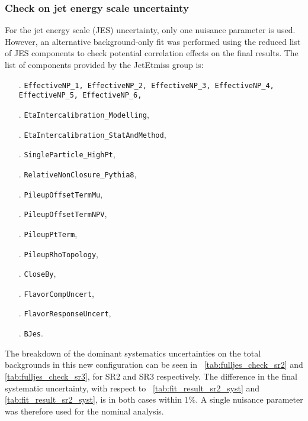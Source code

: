 
\subsubsection{Check on jet energy scale uncertainty} \label{sec:JEScheck}

For the jet energy scale (JES) uncertainty, only one nuisance parameter is used. However, an alternative background-only fit was performed using the reduced list of JES components to check potential correlation effects on the final results.
The list of components provided by the JetEtmiss group is:

{\footnotesize
\begin{itemize}
\item[.] \texttt{EffectiveNP\_1, EffectiveNP\_2, EffectiveNP\_3, EffectiveNP\_4, EffectiveNP\_5, EffectiveNP\_6,}
\item[.] \texttt{EtaIntercalibration\_Modelling},
\item[.] \texttt{EtaIntercalibration\_StatAndMethod},
\item[.] \texttt{SingleParticle\_HighPt},
\item[.] \texttt{RelativeNonClosure\_Pythia8},
\item[.] \texttt{PileupOffsetTermMu},
\item[.] \texttt{PileupOffsetTermNPV},
\item[.] \texttt{PileupPtTerm},
\item[.] \texttt{PileupRhoTopology},
\item[.] \texttt{CloseBy},
\item[.] \texttt{FlavorCompUncert},
\item[.] \texttt{FlavorResponseUncert},
\item[.] \texttt{BJes}.
\end{itemize}
}

The breakdown of the dominant systematics uncertainties on the total backgrounds in this new configuration can be
seen in \Tab\ \ref{tab:fulljes_check_sr2} and \ref{tab:fulljes_check_sr3}, for SR2 and SR3 respectively. The difference in the final
systematic uncertainty, with respect to \Tab\ \ref{tab:fit_result_sr2_syst} and \ref{tab:fit_result_sr2_syst}, is in both cases within $1\%$.
A single nuisance parameter was therefore used for the nominal analysis.


